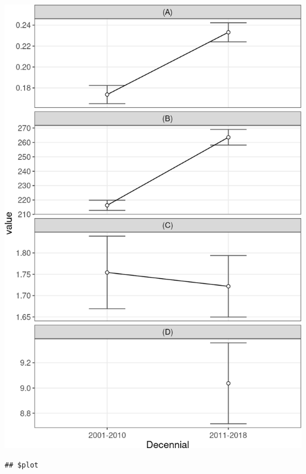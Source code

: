 \documentclass[10pt,landscape,a3paper]{article}
\begin{document}
\begin{center}\includegraphics{img/modelling/aa-eda-ts-18} \end{center}

\begin{verbatim}
## $plot
\end{verbatim}
\end{document}
